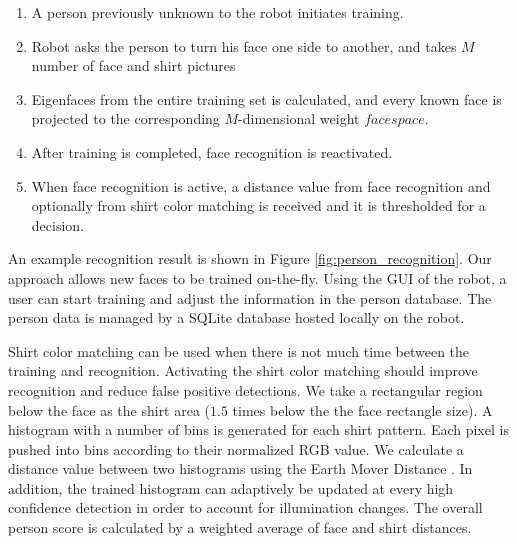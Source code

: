 \begin{enumerate}
\item A person previously unknown to the robot initiates training.
\item Robot asks the person to turn his face one side to another, and takes $M$ number of face and shirt pictures
\item Eigenfaces from the entire training set is calculated, and every known face is projected to the corresponding $M$-dimensional weight $facespace$.
\item After training is completed, face recognition is reactivated.
\item When face recognition is active, a distance value from face recognition and optionally from shirt color matching is received and it is thresholded for a decision.
\end{enumerate}

An example recognition result is shown in Figure \ref{fig:person_recognition}. Our approach allows new faces to be trained on-the-fly. Using the GUI of the robot, a user can start training and adjust the information in the person database. The person data is managed by a SQLite database hosted locally on the robot.

Shirt color matching can be used when there is not much time between the training and recognition. Activating the shirt color matching should improve recognition and reduce false positive detections. We take a rectangular region below the face as the shirt area ($1.5$ times below the the face rectangle size). A histogram with a number of bins is generated for each shirt pattern. Each pixel is pushed into bins according to their normalized RGB value. We calculate a distance value between two histograms using the Earth Mover Distance \cite{rubner1998metric}. In addition, the trained histogram can adaptively be updated at every high confidence detection in order to account for illumination changes. The overall person score is calculated by a weighted average of face and shirt distances.

